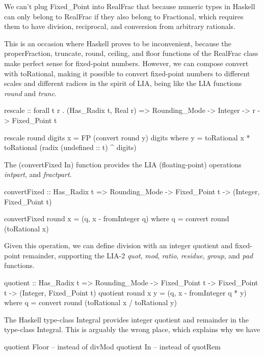 \documentclass{article}
\begin{document}
We can't plug Fixed\_Point into RealFrac that because numeric types
in Haskell can only belong to RealFrac if they also belong to
Fractional, which requires them to have division, reciprocal,
and conversion from arbitrary rationals.

This is an occasion where Haskell proves to be inconvenient,
because the properFraction, truncate, round, ceiling, and floor
functions of the RealFrac class make perfect sense for
fixed-point numbers.  However, we can compose convert with
toRational, making it possible to convert fixed-point numbers
to different scales and different radices in the spirit of LIA,
being like  the LIA functions {\it round} and {\it trunc}.

\begin{code}
rescale :: forall t r . (Has_Radix t, Real r) =>
          Rounding_Mode -> Integer -> r -> Fixed_Point t

rescale round digits x = FP (convert round y) digits
  where y = toRational x * toRational (radix (undefined :: t) ^ digits)
\end{code}

The (convertFixed In) function provides the
LIA (floating-point) operations {\it intpart}, and {\it fractpart}.

\begin{code}
convertFixed :: Has_Radix t =>
    Rounding_Mode -> Fixed_Point t -> (Integer, Fixed_Point t)

convertFixed round x = (q, x - fromInteger q)
  where q = convert round (toRational x)
\end{code}

Given this operation, we can define division with an
integer quotient and fixed-point remainder, supporting
the LIA-2 {\it quot}, {\it mod}, {\it ratio}, {\it residue},
{\it group}, and {\it pad} functions.

\begin{code}
quotient :: Has_Radix t => 
    Rounding_Mode -> Fixed_Point t -> Fixed_Point t ->
    (Integer, Fixed_Point t)
quotient round x y = (q, x - fromInteger q * y)
  where q = convert round (toRational x / toRational y)
\end{code}

The Haskell type-class Integral provides integer quotient
and remainder in the type-class Integral.  This is arguably
the wrong place, which explains why we have
\begin{code}%
quotient Floor -- instead of divMod
quotient In    -- instead of quotRem
\end{code}
\end{document}
